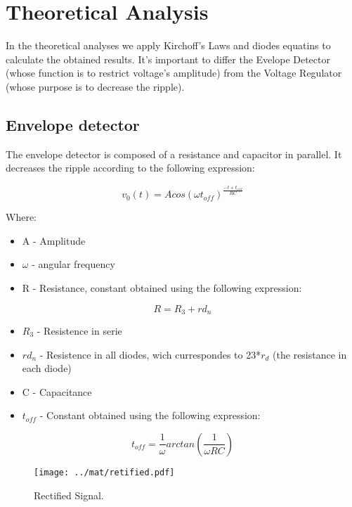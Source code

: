 \section{Theoretical Analysis}
\label{sec:analysis}

In the theoretical analyses we apply Kirchoff's Laws and diodes equatins to calculate the obtained results. It's important to differ the Evelope Detector (whose function is to restrict voltage's amplitude) from the Voltage Regulator (whose purpose is to decrease the ripple).
\subsection{Envelope detector}
The envelope detector is composed of  a resistance and  capacitor in parallel. It decreases the ripple according to the following expression:\par
\begin{equation}
    v_0(t) = Acos(\omega t_{off})^{\frac{-t+t_{off}}{RC}}
\end{equation}\par
Where: \par
\begin{itemize}
  \item A - Amplitude
  \item $\omega$ - angular frequency
  \item R - Resistance, constant obtained using the following expression:
\end{itemize}
\begin{equation}
    R = R_3 + rd_n 
\end{equation}\par
\begin{itemize}
  \item $R_3$ - Resistence in serie
  \item $rd_n$ - Resistence in all diodes,  wich currespondes to 23*$r_d$ (the resistance in each diode)
\end{itemize}
\begin{itemize}
  \item C - Capacitance
  \item $t_{off}$ - Constant obtained using the following expression:
\end{itemize}
\begin{equation}
    t_{off}=\frac{1}{\omega}arctan(\frac{1}{\omega RC})
\end{equation}\par

\begin{figure}[H] \centering
\texttt{[image: ../mat/retified.pdf]}
\caption{Rectified Signal.}
\label{fig:rectified}
\end{figure}

